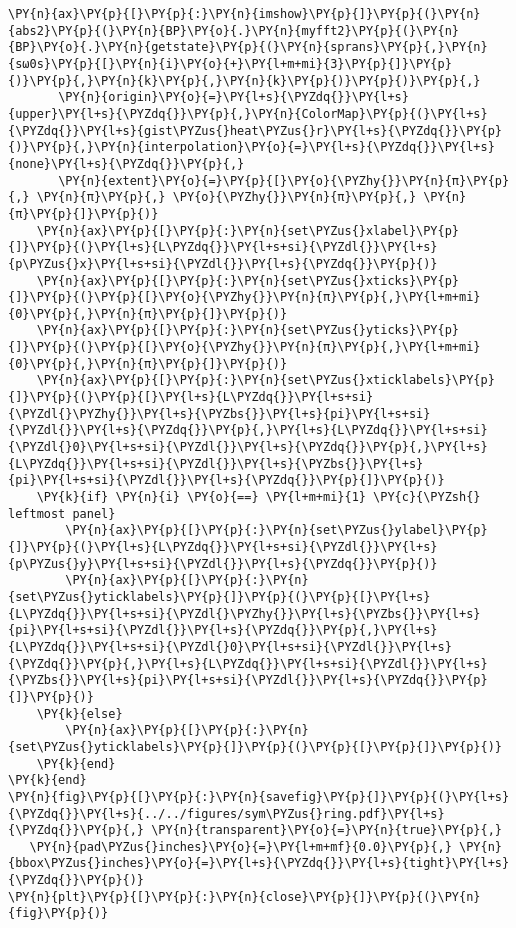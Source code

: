 \begin{Verbatim}[commandchars=\\\{\}]
    \PY{n}{ax}\PY{p}{[}\PY{p}{:}\PY{n}{imshow}\PY{p}{]}\PY{p}{(}\PY{n}{abs2}\PY{p}{(}\PY{n}{BP}\PY{o}{.}\PY{n}{myfft2}\PY{p}{(}\PY{n}{BP}\PY{o}{.}\PY{n}{getstate}\PY{p}{(}\PY{n}{sprans}\PY{p}{,}\PY{n}{sω0s}\PY{p}{[}\PY{n}{i}\PY{o}{+}\PY{l+m+mi}{3}\PY{p}{]}\PY{p}{)}\PY{p}{,}\PY{n}{k}\PY{p}{,}\PY{n}{k}\PY{p}{)}\PY{p}{)}\PY{p}{,}
       \PY{n}{origin}\PY{o}{=}\PY{l+s}{\PYZdq{}}\PY{l+s}{upper}\PY{l+s}{\PYZdq{}}\PY{p}{,}\PY{n}{ColorMap}\PY{p}{(}\PY{l+s}{\PYZdq{}}\PY{l+s}{gist\PYZus{}heat\PYZus{}r}\PY{l+s}{\PYZdq{}}\PY{p}{)}\PY{p}{,}\PY{n}{interpolation}\PY{o}{=}\PY{l+s}{\PYZdq{}}\PY{l+s}{none}\PY{l+s}{\PYZdq{}}\PY{p}{,}
       \PY{n}{extent}\PY{o}{=}\PY{p}{[}\PY{o}{\PYZhy{}}\PY{n}{π}\PY{p}{,} \PY{n}{π}\PY{p}{,} \PY{o}{\PYZhy{}}\PY{n}{π}\PY{p}{,} \PY{n}{π}\PY{p}{]}\PY{p}{)}
    \PY{n}{ax}\PY{p}{[}\PY{p}{:}\PY{n}{set\PYZus{}xlabel}\PY{p}{]}\PY{p}{(}\PY{l+s}{L\PYZdq{}}\PY{l+s+si}{\PYZdl{}}\PY{l+s}{p\PYZus{}x}\PY{l+s+si}{\PYZdl{}}\PY{l+s}{\PYZdq{}}\PY{p}{)}
    \PY{n}{ax}\PY{p}{[}\PY{p}{:}\PY{n}{set\PYZus{}xticks}\PY{p}{]}\PY{p}{(}\PY{p}{[}\PY{o}{\PYZhy{}}\PY{n}{π}\PY{p}{,}\PY{l+m+mi}{0}\PY{p}{,}\PY{n}{π}\PY{p}{]}\PY{p}{)}
    \PY{n}{ax}\PY{p}{[}\PY{p}{:}\PY{n}{set\PYZus{}yticks}\PY{p}{]}\PY{p}{(}\PY{p}{[}\PY{o}{\PYZhy{}}\PY{n}{π}\PY{p}{,}\PY{l+m+mi}{0}\PY{p}{,}\PY{n}{π}\PY{p}{]}\PY{p}{)}
    \PY{n}{ax}\PY{p}{[}\PY{p}{:}\PY{n}{set\PYZus{}xticklabels}\PY{p}{]}\PY{p}{(}\PY{p}{[}\PY{l+s}{L\PYZdq{}}\PY{l+s+si}{\PYZdl{}\PYZhy{}}\PY{l+s}{\PYZbs{}}\PY{l+s}{pi}\PY{l+s+si}{\PYZdl{}}\PY{l+s}{\PYZdq{}}\PY{p}{,}\PY{l+s}{L\PYZdq{}}\PY{l+s+si}{\PYZdl{}0}\PY{l+s+si}{\PYZdl{}}\PY{l+s}{\PYZdq{}}\PY{p}{,}\PY{l+s}{L\PYZdq{}}\PY{l+s+si}{\PYZdl{}}\PY{l+s}{\PYZbs{}}\PY{l+s}{pi}\PY{l+s+si}{\PYZdl{}}\PY{l+s}{\PYZdq{}}\PY{p}{]}\PY{p}{)}
    \PY{k}{if} \PY{n}{i} \PY{o}{==} \PY{l+m+mi}{1} \PY{c}{\PYZsh{} leftmost panel}
        \PY{n}{ax}\PY{p}{[}\PY{p}{:}\PY{n}{set\PYZus{}ylabel}\PY{p}{]}\PY{p}{(}\PY{l+s}{L\PYZdq{}}\PY{l+s+si}{\PYZdl{}}\PY{l+s}{p\PYZus{}y}\PY{l+s+si}{\PYZdl{}}\PY{l+s}{\PYZdq{}}\PY{p}{)}
        \PY{n}{ax}\PY{p}{[}\PY{p}{:}\PY{n}{set\PYZus{}yticklabels}\PY{p}{]}\PY{p}{(}\PY{p}{[}\PY{l+s}{L\PYZdq{}}\PY{l+s+si}{\PYZdl{}\PYZhy{}}\PY{l+s}{\PYZbs{}}\PY{l+s}{pi}\PY{l+s+si}{\PYZdl{}}\PY{l+s}{\PYZdq{}}\PY{p}{,}\PY{l+s}{L\PYZdq{}}\PY{l+s+si}{\PYZdl{}0}\PY{l+s+si}{\PYZdl{}}\PY{l+s}{\PYZdq{}}\PY{p}{,}\PY{l+s}{L\PYZdq{}}\PY{l+s+si}{\PYZdl{}}\PY{l+s}{\PYZbs{}}\PY{l+s}{pi}\PY{l+s+si}{\PYZdl{}}\PY{l+s}{\PYZdq{}}\PY{p}{]}\PY{p}{)}
    \PY{k}{else}
        \PY{n}{ax}\PY{p}{[}\PY{p}{:}\PY{n}{set\PYZus{}yticklabels}\PY{p}{]}\PY{p}{(}\PY{p}{[}\PY{p}{]}\PY{p}{)}
    \PY{k}{end}
\PY{k}{end}
\PY{n}{fig}\PY{p}{[}\PY{p}{:}\PY{n}{savefig}\PY{p}{]}\PY{p}{(}\PY{l+s}{\PYZdq{}}\PY{l+s}{../../figures/sym\PYZus{}ring.pdf}\PY{l+s}{\PYZdq{}}\PY{p}{,} \PY{n}{transparent}\PY{o}{=}\PY{n}{true}\PY{p}{,}
   \PY{n}{pad\PYZus{}inches}\PY{o}{=}\PY{l+m+mf}{0.0}\PY{p}{,} \PY{n}{bbox\PYZus{}inches}\PY{o}{=}\PY{l+s}{\PYZdq{}}\PY{l+s}{tight}\PY{l+s}{\PYZdq{}}\PY{p}{)}
\PY{n}{plt}\PY{p}{[}\PY{p}{:}\PY{n}{close}\PY{p}{]}\PY{p}{(}\PY{n}{fig}\PY{p}{)}


\end{Verbatim}
